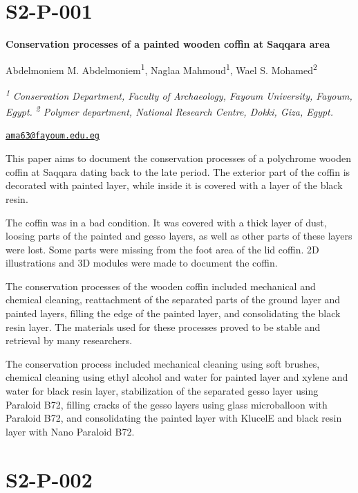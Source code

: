 \documentclass[
]{book}
\begin{document}
\hypertarget{s2-p-001}{%
\section*{S2-P-001}\label{s2-p-001}}

\textbf{Conservation processes of a painted wooden coffin at Saqqara area}

Abdelmoniem M. Abdelmoniem\textsuperscript{1}, Naglaa Mahmoud\textsuperscript{1}, Wael S. Mohamed\textsuperscript{2}

\textsuperscript{\emph{1}} \emph{Conservation Department, Faculty of Archaeology, Fayoum University, Fayoum, Egypt. \textsuperscript{2} Polymer department, National Research Centre, Dokki, Giza, Egypt.}

\href{mailto:ama63@fayoum.edu.eg}{\nolinkurl{ama63@fayoum.edu.eg}}

This paper aims to document the conservation processes of a polychrome wooden coffin at Saqqara dating back to the late period. The exterior part of the coffin is decorated with painted layer, while inside it is covered with a layer of the black resin.

The coffin was in a bad condition. It was covered with a thick layer of dust, loosing parts of the painted and gesso layers, as well as other parts of these layers were lost. Some parts were missing from the foot area of the lid coffin. 2D illustrations and 3D modules were made to document the coffin.

The conservation processes of the wooden coffin included mechanical and chemical cleaning, reattachment of the separated parts of the ground layer and painted layers, filling the edge of the painted layer, and consolidating the black resin layer. The materials used for these processes proved to be stable and retrieval by many researchers.

The conservation process included mechanical cleaning using soft brushes, chemical cleaning using ethyl alcohol and water for painted layer and xylene and water for black resin layer, stabilization of the separated gesso layer using Paraloid B72, filling cracks of the gesso layers using glass microballoon with Paraloid B72, and consolidating the painted layer with KlucelE and black resin layer with Nano Paraloid B72.

\hypertarget{s2-p-002}{%
\section*{S2-P-002}\label{s2-p-002}}
\end{document}
